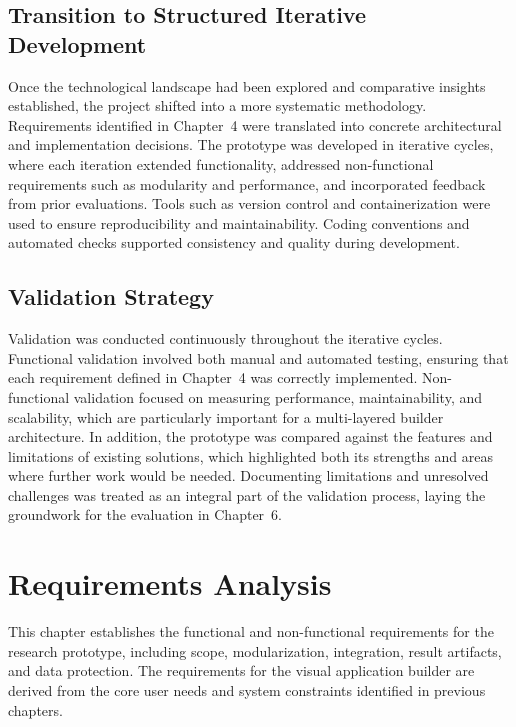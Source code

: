 \documentclass[oneside,12pt]{book}
\begin{document}
\section{Transition to Structured Iterative Development}

Once the technological landscape had been explored and comparative insights established, the project shifted into a more systematic methodology. Requirements identified in Chapter~4 were translated into concrete architectural and implementation decisions. The prototype was developed in iterative cycles, where each iteration extended functionality, addressed non-functional requirements such as modularity and performance, and incorporated feedback from prior evaluations. Tools such as version control and containerization were used to ensure reproducibility and maintainability. Coding conventions and automated checks supported consistency and quality during development.

\section{Validation Strategy}

Validation was conducted continuously throughout the iterative cycles. Functional validation involved both manual and automated testing, ensuring that each requirement defined in Chapter~4 was correctly implemented. Non-functional validation focused on measuring performance, maintainability, and scalability, which are particularly important for a multi-layered builder architecture. In addition, the prototype was compared against the features and limitations of existing solutions, which highlighted both its strengths and areas where further work would be needed. Documenting limitations and unresolved challenges was treated as an integral part of the validation process, laying the groundwork for the evaluation in Chapter~6.




\chapter{Requirements Analysis}
This chapter establishes the functional and non-functional requirements for the research prototype, including scope, modularization, integration, result artifacts, and data protection.
The requirements for the visual application builder are derived from the core user needs and system constraints identified in previous chapters.
\end{document}
